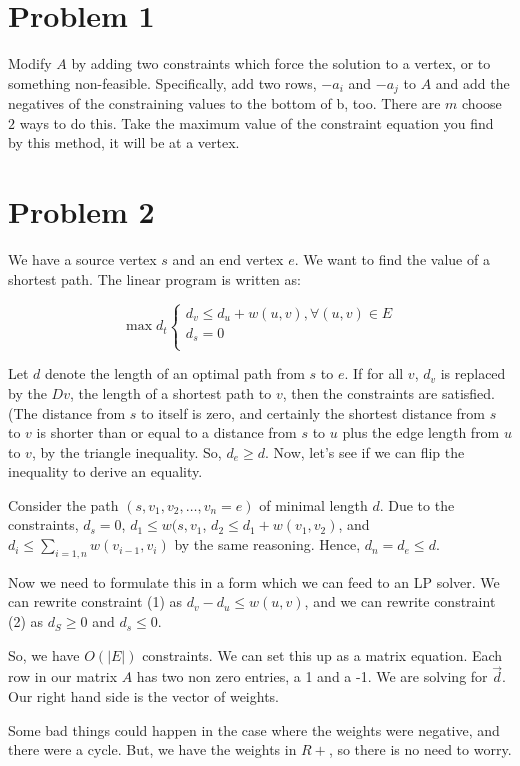 \documentclass[10pt]{article}
\begin{document}
\section*{Problem 1}
Modify $A$ by adding two constraints which force the solution to a vertex, or to something non-feasible. Specifically, add two rows, $-a_i$ and $-a_j$ to $A$ and add the negatives of the constraining values to the bottom of b, too. There are $m$ choose $2$ ways to do this. Take the maximum value of the constraint equation you find by this method, it will be at a vertex.

\section*{Problem 2}
We have a source vertex $s$ and an end vertex $e$. We want to find the value of a shortest path. The linear program is written as:

\[  \max d_t  \left\{
\begin{array}{ll}
       d_v \le d_u + w(u, v), \forall (u, v) \in E\\
       d_s = 0\\
\end{array} 
\right. \]

Let $d$ denote the length of an optimal path from $s$ to $e$. If for all $v$, $d_v$ is replaced by the $Dv$, the length of a shortest path to $v$, then the constraints are satisfied. (The distance from $s$ to itself is zero, and certainly the shortest distance from $s$ to $v$ is shorter than or equal to a distance from $s$ to $u$ plus the edge length from $u$ to $v$, by the triangle inequality. So, $d_e\ge d$. Now, let's see if we can flip the inequality to derive an equality.

Consider the path $(s, v_1, v_2, \dots, v_n =  e)$ of minimal length $d$.  Due to the constraints, $d_s = 0$, $d_1 \le w(s, v_1$, $d_2 \le d_1 + w(v_1, v_2)$, and $d_i \le \sum\limits_{i=1, n} w(v_{i-1}, v_i)$ by the same reasoning. Hence, $d_n = d_e \le d$. 

Now we need to formulate this in a form which we can feed to an LP solver. We can rewrite constraint (1) as $d_v - d_u \le w(u,v)$, and we can rewrite constraint (2) as $d_S \ge 0$ and $d_s \le 0$. 

So, we have $O(|E|)$ constraints. We can set this up as a matrix equation. Each row in our matrix $A$ has two non zero entries, a 1 and a -1. We are solving for $\vec{d}$. Our right hand side is the vector of weights. 

Some bad things could happen in the case where the weights were negative, and there were a cycle. But, we have the weights in $R+$, so there is no need to worry.
\end{document}
